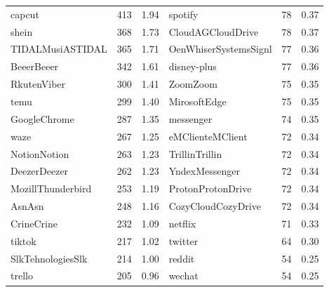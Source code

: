 \begin{table}[h!]
\begin{tabular}{llllll}
		capcut              & 413             & 1.94                 & spotify                 & 78              & 0.37                 \\
		shein               & 368             & 1.73                 & CloudAGCloudDrive       & 78              & 0.37                 \\
		TIDALMusiASTIDAL    & 365             & 1.71                 & OenWhiserSystemsSignl   & 77              & 0.36                 \\
		BeeerBeeer          & 342             & 1.61                 & disney-plus             & 77              & 0.36                 \\
		RkutenViber         & 300             & 1.41                 & ZoomZoom                & 75              & 0.35                 \\
		temu                & 299             & 1.40                 & MirosoftEdge            & 75              & 0.35                 \\
		GoogleChrome        & 287             & 1.35                 & messenger               & 74              & 0.35                 \\
		waze                & 267             & 1.25                 & eMClienteMClient        & 72              & 0.34                 \\
		NotionNotion        & 263             & 1.23                 & TrillinTrillin          & 72              & 0.34                 \\
		DeezerDeezer        & 262             & 1.23                 & YndexMessenger          & 72              & 0.34                 \\
		MozillThunderbird   & 253             & 1.19                 & ProtonProtonDrive       & 72              & 0.34                 \\
		AsnAsn              & 248             & 1.16                 & CozyCloudCozyDrive      & 72              & 0.34                 \\
		CrineCrine          & 232             & 1.09                 & netflix                 & 71              & 0.33                 \\
		tiktok              & 217             & 1.02                 & twitter                 & 64              & 0.30                 \\
		SlkTehnologiesSlk   & 214             & 1.00                 & reddit                  & 54              & 0.25                 \\
		trello              & 205             & 0.96                 & wechat                  & 54              & 0.25                 \\

\end{tabular}
\end{table}
